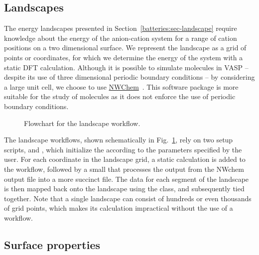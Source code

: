 \begin{refsection}
\subsection{Landscapes} \label{automation:sec-landscape}

The energy landscapes presented in Section~\ref{batteries:sec-landscape} require 
knowledge about the energy of the anion-cation system for a range of cation 
positions on a two dimensional surface. We represent the landscape as a grid of 
points or coordinates, for which we determine the energy of the system with a 
static DFT calculation. Although it is possible to simulate molecules in VASP 
-- despite its use of three dimensional periodic boundary conditions -- by 
considering a large unit cell, we choose to use 
\href{http://www.nwchem-sw.org/index.php/Main_Page}{NWChem}~\cite{Valiev2010}. 
This software package is more suitable for the study of molecules as it does 
not enforce the use of periodic boundary conditions. 

\begin{figure}[ht] 
 
\caption{Flowchart for the landscape workflow.} 
\label{automation:fig-landscape} 
\end{figure} 

The landscape workflows, shown schematically in Fig.~\ref{automation:fig-landscape}, 
rely on two setup scripts,  and , which 
initialize the  according to the parameters specified by the 
user. For each coordinate in the landscape grid, a static calculation is added 
to the workflow, followed by a small  that processes the output 
from the NWchem output file into a more succinct  file. The data for
each segment of the landscape is then mapped back onto the landscape using the 
 class, and subsequently tied together. Note that a single 
landscape can consist of hundreds or even thousands of grid points, which makes 
its calculation impractical without the use of a workflow.

\subsection{Surface properties}\label{automation:sec-surface} 
 

\end{refsection}
